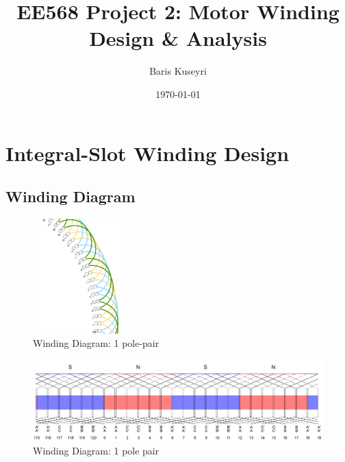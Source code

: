\documentclass[a4paper, 11pt]{article}
\begin{document}
\title{EE568 Project 2: Motor Winding Design \& Analysis}
\author{Baris Kuseyri}
\date{\today}
\maketitle

\tableofcontents
\newpage


\section{Integral-Slot Winding Design}
\subsection{Winding Diagram}

\begin{figure}
	\vspace{-20pt}
	\begin{center}
		\includegraphics[width=0.3\textwidth]{Q1_windingDiagram_1pp_dolomites.png}
	\end{center}
	\vspace{-20pt}
	\caption{Winding Diagram: 1 pole-pair}
	\vspace{-10pt}
\end{figure}

\begin{figure}
	\vspace{-20pt}
	\begin{center}
		\includegraphics[width=1.0\textwidth]{Q1_windingDiagram_1pp.png}
	\end{center}
	\vspace{-20pt}
	\caption{Winding Diagram: 1 pole pair}
	\vspace{-10pt}
\end{figure}
\end{document}
